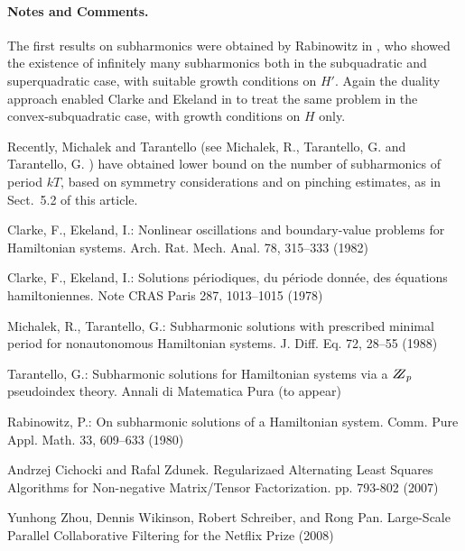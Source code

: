 \documentclass{llncs}
\begin{document}
\paragraph{Notes and Comments.}
The first results on subharmonics were
obtained by Rabinowitz in \cite{2rab}, who showed the existence of
infinitely many subharmonics both in the subquadratic and superquadratic
case, with suitable growth conditions on $H'$. Again the duality
approach enabled Clarke and Ekeland in \cite{2clar:eke:2} to treat the
same problem in the convex-subquadratic case, with growth conditions on
$H$ only.

Recently, Michalek and Tarantello (see Michalek, R., Tarantello, G.
\cite{2mich:tar} and Tarantello, G. \cite{2tar}) have obtained lower
bound on the number of subharmonics of period $kT$, based on symmetry
considerations and on pinching estimates, as in Sect.~5.2 of this
article.

%
%
\begin{thebibliography}{}
%
Clarke, F., Ekeland, I.:
Nonlinear oscillations and
boundary-value problems for Hamiltonian systems.
Arch. Rat. Mech. Anal. 78, 315--333 (1982)

Clarke, F., Ekeland, I.:
Solutions p\'{e}riodiques, du
p\'{e}riode donn\'{e}e, des \'{e}quations hamiltoniennes.
Note CRAS Paris 287, 1013--1015 (1978)

Michalek, R., Tarantello, G.:
Subharmonic solutions with prescribed minimal
period for nonautonomous Hamiltonian systems.
J. Diff. Eq. 72, 28--55 (1988)

Tarantello, G.:
Subharmonic solutions for Hamiltonian
systems via a $\bbbz_{p}$ pseudoindex theory.
Annali di Matematica Pura (to appear)

Rabinowitz, P.:
On subharmonic solutions of a Hamiltonian system.
Comm. Pure Appl. Math. 33, 609--633 (1980)

Andrzej Cichocki and Rafal Zdunek. Regularizaed Alternating Least Squares Algorithms for Non-negative Matrix/Tensor Factorization. pp. 793-802 (2007)

Yunhong Zhou, Dennis Wikinson, Robert Schreiber, and Rong Pan. Large-Scale Parallel Collaborative Filtering for the Netflix Prize (2008)

\end{thebibliography}
\clearpage
{} %
\renewcommand{\indexname}{Author Index}
\printindex
\clearpage
\end{document}
